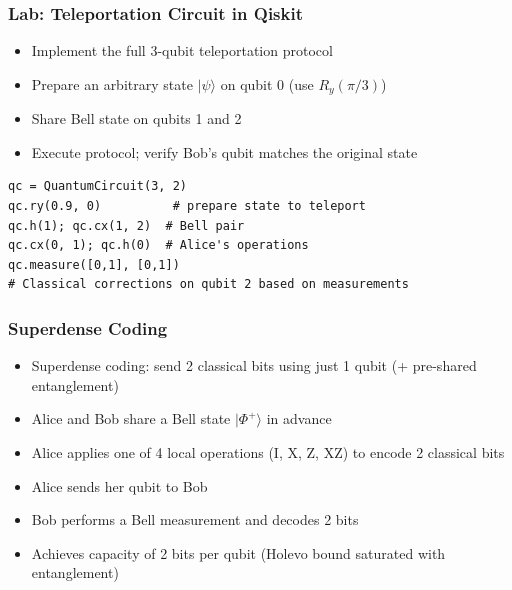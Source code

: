 \begin{frame}[fragile]\frametitle{Lab: Teleportation Circuit in Qiskit}
\begin{itemize}
\item Implement the full 3-qubit teleportation protocol
\item Prepare an arbitrary state $|\psi\rangle$ on qubit 0 (use $R_y(\pi/3)$)
\item Share Bell state on qubits 1 and 2
\item Execute protocol; verify Bob's qubit matches the original state
\end{itemize}
\begin{verbatim}
qc = QuantumCircuit(3, 2)
qc.ry(0.9, 0)          # prepare state to teleport
qc.h(1); qc.cx(1, 2)  # Bell pair
qc.cx(0, 1); qc.h(0)  # Alice's operations
qc.measure([0,1], [0,1])
# Classical corrections on qubit 2 based on measurements
\end{verbatim}
\end{frame}

\begin{frame}[fragile]\frametitle{Superdense Coding}
\begin{itemize}
\item Superdense coding: send 2 classical bits using just 1 qubit (+ pre-shared entanglement)
\item Alice and Bob share a Bell state $|\Phi^+\rangle$ in advance
\item Alice applies one of 4 local operations (I, X, Z, XZ) to encode 2 classical bits
\item Alice sends her qubit to Bob
\item Bob performs a Bell measurement and decodes 2 bits
\item Achieves capacity of 2 bits per qubit (Holevo bound saturated with entanglement)
\end{itemize}
\end{frame}

